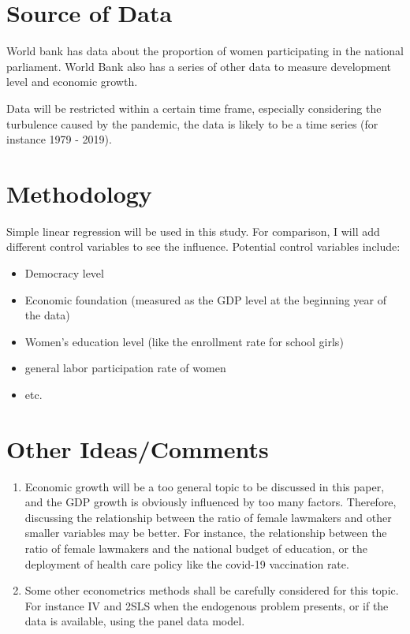 \documentclass[12pt]{article}
\begin{document}
\section*{Source of Data}
World bank has data about the proportion of women participating in the national parliament.
World Bank also has a series of other data to measure development level and economic growth.


Data will be restricted within a certain time frame, especially considering the turbulence caused by the pandemic, the data is likely to be a time series (for instance 1979 - 2019).

\section*{Methodology}


Simple linear regression will be used in this study.
For comparison, I will add different control variables to see the influence.
Potential control variables include:
\begin{itemize}
	\item Democracy level
	\item Economic foundation (measured as the GDP level at the beginning year of the data)
	\item Women's education level (like the enrollment rate for school girls)
	\item general labor participation rate of women
	\item etc.
\end{itemize}

\section*{Other Ideas/Comments}
\begin{enumerate}
	\item Economic growth will be a too general topic to be discussed in this paper, and the GDP growth is obviously influenced by too many factors. Therefore, discussing the relationship between the ratio of female lawmakers and other smaller variables may be better. For instance, the relationship between the ratio of female lawmakers and the national budget of education, or the deployment of health care policy like the covid-19 vaccination rate.
	\item Some other econometrics methods shall be carefully considered for this topic. For instance IV and 2SLS when the endogenous problem presents, or if the data is available, using the panel data model. 
\end{enumerate}
\end{document}

